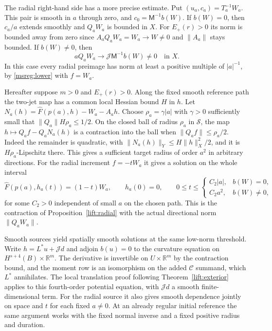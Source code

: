 \documentclass[11pt]{article}
\numberwithin{equation}{section}
\theoremstyle{definition}
\theoremstyle{remark}
\begin{document}
The radial right-hand side has a more precise estimate.
Put \((u_a,c_a)=T_a^{-1}W_a\). This pair is smooth in \(a\)
through zero, and \(c_0=\mathsf M^{-1}b(W)\). If \(b(W)=0\),
then \(c_a/a\) extends smoothly and \(Q_aW_a\) is bounded in \(X\).
For \(E_+(r)>0\) its norm is bounded away from zero since
\(A_aQ_aW_a=W_a\to W\ne0\) and \(\|A_a\|\) stays bounded.
If \(b(W)\ne0\), then
\begin{equation}
 aQ_aW_a\longrightarrow \mathcal J\mathsf M^{-1}b(W)\ne0
                         \quad\text{in }X .
 \label{msreg:radialpole}
\end{equation}
In this case every radial preimage has norm at least a
positive multiple of \(|a|^{-1}\), by \eqref{msreg:lower}
with \(f=W_a\).

Hereafter suppose \(m>0\) and \(E_+(r)>0\). Along the fixed smooth
reference path the two-jet map has a common local Hessian bound \(H\)
in \(h\). Let
\(N_a(h)=\widehat F(p(a),h)-W_a-A_ah\).
Choose \(\rho_a=\gamma|a|\) with \(\gamma>0\) sufficiently small
that \(\|Q_a\|H\rho_a\le1/2\). On the closed ball of radius
\(\rho_a\) in \(\mathcal S\), the map
\(h\mapsto Q_af-Q_aN_a(h)\) is a contraction into the ball
when \(\|Q_af\|\le\rho_a/2\). Indeed the remainder is quadratic,
with \(\|N_a(h)\|_Y\le H\|h\|_X^2/2\), and it is
\(H\rho_a\)-Lipschitz there. This gives a sufficient target
radius of order \(a^2\) in arbitrary directions. For the radial
increment \(f=-tW_a\) it gives a solution on the whole interval
\begin{equation}
 \widehat F(p(a),h_a(t))=(1-t)W_a,\qquad
 h_a(0)=0,\qquad
 0\le t\le
 \begin{cases}
 C_2|a|,& b(W)=0,\\
 C_2 a^2,& b(W)\ne0 ,
 \end{cases}
 \label{msreg:radialstep}
\end{equation}
for some \(C_2>0\) independent of small \(a\) on the chosen path.
This is the contraction of Proposition~\ref{lift:radial}
with the actual directional norm \(\|Q_aW_a\|\).

Smooth sources yield spatially smooth solutions at the same
low-norm threshold. Write \(h=L^*u+\mathcal J d\) and adjoin
\(b(u)=0\) to the curvature equation on
\(H^{s+4}(B)\times\mathbb R^m\). The derivative is invertible on
\(U\times\mathbb R^m\) by the contraction bound, and the moment
row is an isomorphism on the added \(\mathcal C\) summand, which
\(L^*\) annihilates. The local translation proof following
Theorem~\ref{lift:exterior} applies to this fourth-order potential
equation, with \(\mathcal J d\) a smooth finite-dimensional
term. For the radial source it also gives smooth dependence
jointly on space and \(t\) for each fixed \(a\ne0\). At an
already regular initial reference the same argument works
with the fixed normal inverse and a fixed positive radius
and duration.
\end{document}
